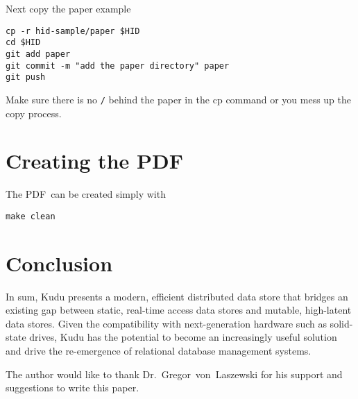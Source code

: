 Next copy the paper example

\begin{verbatim}
cp -r hid-sample/paper $HID
cd $HID
git add paper
git commit -m "add the paper directory" paper
git push
\end{verbatim}

Make sure there is no \verb|/| behind the paper in the cp command or you mess up the
copy process.


\section{Creating the PDF}

The PDF\ can be created simply with 

\begin{verbatim}
make clean
\end{verbatim}


\section{Conclusion}

In sum, Kudu presents a modern, efficient distributed data store that bridges an existing gap between static, real-time access data stores and mutable, high-latent data stores. Given the compatibility with next-generation hardware such as solid-state drives, Kudu has the potential to become an increasingly useful solution and drive the re-emergence of relational database management systems. 


\begin{acks}

  The author would like to thank Dr.~Gregor~von~Laszewski for his
  support and suggestions to write this paper.

\end{acks}


 

